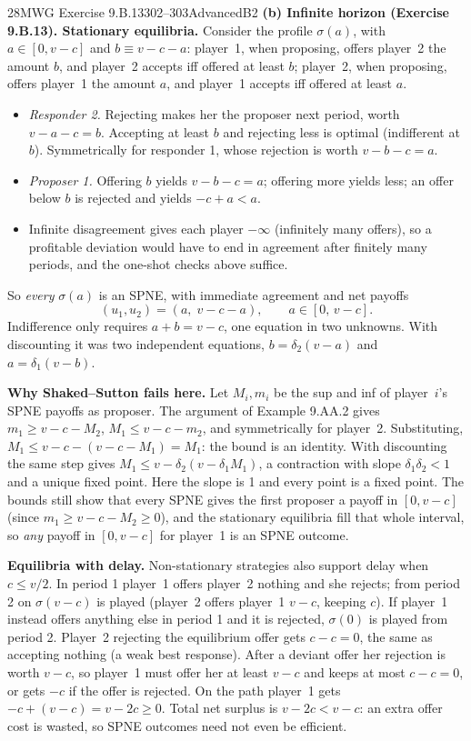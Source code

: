 \begin{exsol}{28}{MWG Exercise 9.B.13}{302--303}{Advanced}{B2}
\textbf{(b) Infinite horizon (Exercise 9.B.13). Stationary equilibria.} Consider the profile
$\sigma(a)$, with $a \in [0, v - c]$ and $b \equiv v - c - a$: player~1, when proposing, offers
player~2 the amount $b$, and player~2 accepts iff offered at least $b$; player~2, when proposing,
offers player~1 the amount $a$, and player~1 accepts iff offered at least $a$.
\begin{itemize}
  \item \emph{Responder 2.} Rejecting makes her the proposer next period, worth $v - a - c = b$.
  Accepting at least $b$ and rejecting less is optimal (indifferent at $b$). Symmetrically for
  responder 1, whose rejection is worth $v - b - c = a$.
  \item \emph{Proposer 1.} Offering $b$ yields $v - b - c = a$; offering more yields less; an
  offer below $b$ is rejected and yields $-c + a < a$.
  \item Infinite disagreement gives each player $-\infty$ (infinitely many offers), so a profitable
  deviation would have to end in agreement after finitely many periods, and the one-shot checks
  above suffice.
\end{itemize}
So \emph{every} $\sigma(a)$ is an SPNE, with immediate agreement and net payoffs
\[
  (u_1, u_2) = (a,\; v - c - a), \qquad a \in [0,\, v - c].
\]
Indifference only requires $a + b = v - c$, one equation in two unknowns. With discounting it
was two independent equations, $b = \delta_2 (v - a)$ and $a = \delta_1 (v - b)$.

\textbf{Why Shaked--Sutton fails here.} Let $M_i, m_i$ be the sup and inf of player~$i$'s SPNE
payoffs as proposer. The argument of Example 9.AA.2 gives $m_1 \ge v - c - M_2$,
$M_1 \le v - c - m_2$, and symmetrically for player~2. Substituting,
$M_1 \le v - c - (v - c - M_1) = M_1$: the bound is an identity. With discounting the same step
gives $M_1 \le v - \delta_2(v - \delta_1 M_1)$, a contraction with slope $\delta_1\delta_2 < 1$ and a
unique fixed point. Here the slope is 1 and every point is a fixed point. The bounds still
show that every SPNE gives the first proposer a payoff in $[0, v - c]$ (since
$m_1 \ge v - c - M_2 \ge 0$), and the stationary equilibria fill that whole interval, so
\emph{any} payoff in $[0, v-c]$ for player~1 is an SPNE outcome.

\textbf{Equilibria with delay.} Non-stationary strategies also support delay when
$c \le v/2$. In period 1 player~1 offers player~2 nothing and she rejects; from period 2 on
$\sigma(v - c)$ is played (player~2 offers player~1 $v - c$, keeping $c$). If player~1 instead
offers anything else in period 1 and it is rejected, $\sigma(0)$ is played from period 2. Player~2
rejecting the equilibrium offer gets $c - c = 0$, the same as accepting nothing (a weak best
response). After a deviant offer her rejection is worth $v - c$, so player~1 must offer her at
least $v - c$ and keeps at most $c - c = 0$, or gets $-c$ if the offer is rejected. On the path
player~1 gets $-c + (v - c) = v - 2c \ge 0$. Total net surplus is $v - 2c < v - c$: an extra offer
cost is wasted, so SPNE outcomes need not even be efficient.


\end{exsol}
